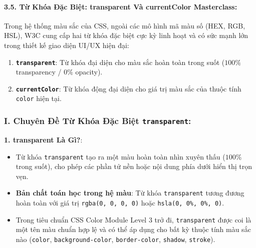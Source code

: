 \documentclass[11pt,oneside]{book}
\newcommand{\codeinline}[1]{\textcolor{accentOrange}{\texttt{#1}}}
\begin{document}
\paragraph{3.5. Từ Khóa Đặc Biệt: transparent Và currentColor Masterclass:}

\begin{conceptBox}
Trong hệ thống màu sắc của CSS, ngoài các mô hình mã màu số (HEX, RGB, HSL), W3C cung cấp hai từ khóa đặc biệt cực kỳ linh hoạt và có sức mạnh lớn trong thiết kế giao diện UI/UX hiện đại:
\begin{enumerate}[leftmargin=1.5em, itemsep=3pt, parsep=0pt]
    \item \textbf{\codeinline{transparent}}: Từ khóa đại diện cho màu sắc hoàn toàn trong suốt ($100\%$ transparency / $0\%$ opacity).
    \item \textbf{\codeinline{currentColor}}: Từ khóa động đại diện cho giá trị màu sắc của thuộc tính \codeinline{color} hiện tại.
\end{enumerate}
\end{conceptBox}

\subsubsection*{I. Chuyên Đề Từ Khóa Đặc Biệt \codeinline{transparent}:}

\begin{conceptBox}
\textbf{1. transparent Là Gì?}:
\begin{itemize}[leftmargin=1.5em, itemsep=3pt, parsep=0pt]
    \item Từ khóa \codeinline{transparent} tạo ra một màu hoàn toàn nhìn xuyên thấu ($100\%$ trong suốt), cho phép các phần tử nền hoặc nội dung phía dưới hiển thị trọn vẹn.
    \item \textbf{Bản chất toán học trong hệ màu}: Từ khóa \codeinline{transparent} tương đương hoàn toàn với giá trị \codeinline{rgba(0, 0, 0, 0)} hoặc \codeinline{hsla(0, 0\%, 0\%, 0)}.
    \item Trong tiêu chuẩn CSS Color Module Level 3 trở đi, \codeinline{transparent} được coi là một tên màu chuẩn hợp lệ và có thể áp dụng cho bất kỳ thuộc tính màu sắc nào (\codeinline{color}, \codeinline{background-color}, \codeinline{border-color}, \codeinline{shadow}, \codeinline{stroke}).
\end{itemize}
\end{conceptBox}
\end{document}
